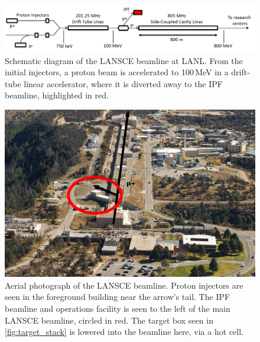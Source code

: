 



\begin{figure}
 \centering
 \includegraphics[width=0.75\columnwidth]{./figures/ipf_beamline_schematic.png}
 \caption{Schematic diagram of the LANSCE beamline at LANL. From the initial injectors, a proton beam is accelerated to 100\,MeV in a drift-tube linear accelerator, where it is diverted away to the IPF beamline, highlighted in red.}
 \label{fig:ipf_beamline_schematic}
\end{figure}

\begin{figure}
 \centering
 \includegraphics[width=0.75\columnwidth]{./figures/ipf_beamline_alternate.png}
 \caption{Aerial photograph of the LANSCE beamline. Proton injectors are seen in the foreground building near the arrow's tail. The IPF beamline and operations facility is seen to the left of the main LANSCE beamline, circled in red.  The target box seen in \autoref{fig:target_stack} is lowered into the beamline here, via a hot cell.}
 \label{fig:ipf_beamline_alternate}
\end{figure}



